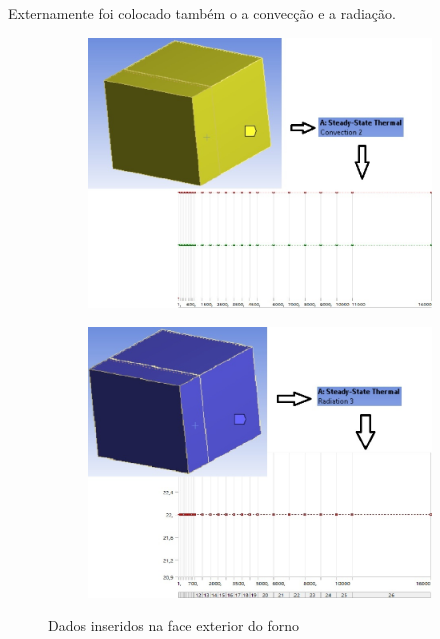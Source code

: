 Externamente foi colocado também o a convecção e a radiação.
\begin{figure}[ht]
\centering
    \begin{subfigure}{0.49\linewidth} \centering
        \includegraphics[scale=0.5]{figuras/ansys8.jpg}
        \label{ansys8}
    \end{subfigure}
    \begin{subfigure}{0.49\linewidth} \centering
        \includegraphics[scale=0.5]{figuras/ansys9.jpg}
        \label{ansys9}
    \end{subfigure}
    \caption{Dados inseridos na face exterior do forno}
\end{figure}

